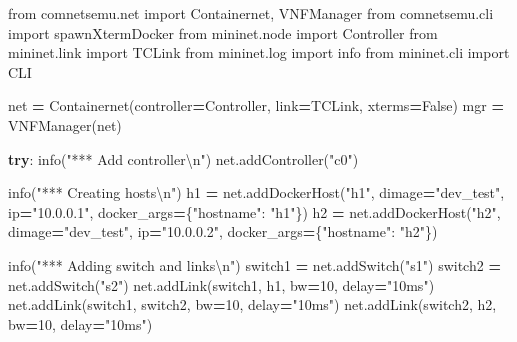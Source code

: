 \documentclass[
  italian,
  openany]{book}
\newenvironment{Shaded}{\begin{snugshade}}{\end{snugshade}}
\newcommand{\CharTok}[1]{\textcolor[rgb]{0.31,0.60,0.02}{#1}}
\newcommand{\ControlFlowTok}[1]{\textcolor[rgb]{0.13,0.29,0.53}{\textbf{#1}}}
\newcommand{\DecValTok}[1]{\textcolor[rgb]{0.00,0.00,0.81}{#1}}
\newcommand{\ImportTok}[1]{#1}
\newcommand{\NormalTok}[1]{#1}
\newcommand{\OperatorTok}[1]{\textcolor[rgb]{0.81,0.36,0.00}{\textbf{#1}}}
\newcommand{\StringTok}[1]{\textcolor[rgb]{0.31,0.60,0.02}{#1}}
\newcommand{\VariableTok}[1]{\textcolor[rgb]{0.00,0.00,0.00}{#1}}
\begin{document}
\begin{Shaded}
\begin{Highlighting}[]
\ImportTok{from}\NormalTok{ comnetsemu.net }\ImportTok{import}\NormalTok{ Containernet, VNFManager}
\ImportTok{from}\NormalTok{ comnetsemu.cli }\ImportTok{import}\NormalTok{ spawnXtermDocker}
\ImportTok{from}\NormalTok{ mininet.node }\ImportTok{import}\NormalTok{ Controller}
\ImportTok{from}\NormalTok{ mininet.link }\ImportTok{import}\NormalTok{ TCLink}
\ImportTok{from}\NormalTok{ mininet.log }\ImportTok{import}\NormalTok{ info}
\ImportTok{from}\NormalTok{ mininet.cli }\ImportTok{import}\NormalTok{ CLI}

\NormalTok{net }\OperatorTok{=}\NormalTok{ Containernet(controller}\OperatorTok{=}\NormalTok{Controller, link}\OperatorTok{=}\NormalTok{TCLink, xterms}\OperatorTok{=}\VariableTok{False}\NormalTok{)}
\NormalTok{mgr }\OperatorTok{=}\NormalTok{ VNFManager(net)}

\ControlFlowTok{try}\NormalTok{:}
\NormalTok{    info(}\StringTok{"*** Add controller}\CharTok{\textbackslash{}n}\StringTok{"}\NormalTok{)}
\NormalTok{    net.addController(}\StringTok{"c0"}\NormalTok{)}

\NormalTok{    info(}\StringTok{"*** Creating hosts}\CharTok{\textbackslash{}n}\StringTok{"}\NormalTok{)}
\NormalTok{    h1 }\OperatorTok{=}\NormalTok{ net.addDockerHost(}\StringTok{"h1"}\NormalTok{, dimage}\OperatorTok{=}\StringTok{"dev\_test"}\NormalTok{,}
\NormalTok{         ip}\OperatorTok{=}\StringTok{"10.0.0.1"}\NormalTok{, docker\_args}\OperatorTok{=}\NormalTok{\{}\StringTok{"hostname"}\NormalTok{: }\StringTok{"h1"}\NormalTok{\})}
\NormalTok{    h2 }\OperatorTok{=}\NormalTok{ net.addDockerHost(}\StringTok{"h2"}\NormalTok{, dimage}\OperatorTok{=}\StringTok{"dev\_test"}\NormalTok{,}
\NormalTok{         ip}\OperatorTok{=}\StringTok{"10.0.0.2"}\NormalTok{, docker\_args}\OperatorTok{=}\NormalTok{\{}\StringTok{"hostname"}\NormalTok{: }\StringTok{"h2"}\NormalTok{\})}

\NormalTok{    info(}\StringTok{"*** Adding switch and links}\CharTok{\textbackslash{}n}\StringTok{"}\NormalTok{)}
\NormalTok{    switch1 }\OperatorTok{=}\NormalTok{ net.addSwitch(}\StringTok{"s1"}\NormalTok{)}
\NormalTok{    switch2 }\OperatorTok{=}\NormalTok{ net.addSwitch(}\StringTok{"s2"}\NormalTok{)}
\NormalTok{    net.addLink(switch1, h1, bw}\OperatorTok{=}\DecValTok{10}\NormalTok{, delay}\OperatorTok{=}\StringTok{"10ms"}\NormalTok{)}
\NormalTok{    net.addLink(switch1, switch2, bw}\OperatorTok{=}\DecValTok{10}\NormalTok{, delay}\OperatorTok{=}\StringTok{"10ms"}\NormalTok{)}
\NormalTok{    net.addLink(switch2, h2, bw}\OperatorTok{=}\DecValTok{10}\NormalTok{, delay}\OperatorTok{=}\StringTok{"10ms"}\NormalTok{)}


\end{Highlighting}
\end{Shaded}
\end{document}
